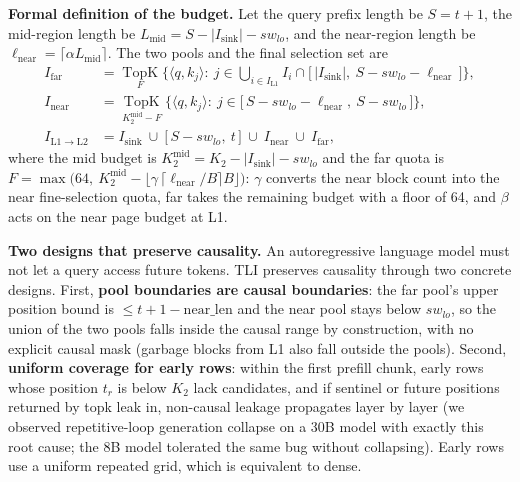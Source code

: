 \documentclass[11pt]{article}
\begin{document}
\textbf{Formal definition of the budget.} Let the query prefix length be $S=t+1$, the mid-region length be $L_{\mathrm{mid}}=S-|I_{\mathrm{sink}}|-sw_{lo}$, and the near-region length be $\ell_{\mathrm{near}}=\lceil\alpha L_{\mathrm{mid}}\rceil$. The two pools and the final selection set are
\begin{align}
I_{\mathrm{far}} &= \operatorname*{TopK}_{F}\Big\{\langle q,k_j\rangle:\ j\in\bigcup\nolimits_{i\in I_{\mathrm{L1}}} I_i\cap\big[\,|I_{\mathrm{sink}}|,\ S-sw_{lo}-\ell_{\mathrm{near}}\,\big]\Big\},\\
I_{\mathrm{near}} &= \operatorname*{TopK}_{K_2^{\mathrm{mid}}-F}\Big\{\langle q,k_j\rangle:\ j\in\big[\,S-sw_{lo}-\ell_{\mathrm{near}},\ S-sw_{lo}\,\big]\Big\},\\
I_{\mathrm{L1}\rightarrow\mathrm{L2}} &= I_{\mathrm{sink}}\ \cup\ \big[\,S-sw_{lo},\ t\,\big]\ \cup\ I_{\mathrm{near}}\ \cup\ I_{\mathrm{far}},
\end{align}
where the mid budget is $K_2^{\mathrm{mid}}=K_2-|I_{\mathrm{sink}}|-sw_{lo}$ and the far quota is $F=\max\big(64,\ K_2^{\mathrm{mid}}-\lfloor\gamma\,\lceil\ell_{\mathrm{near}}/B\rceil B\rfloor\big)$: $\gamma$ converts the near block count into the near fine-selection quota, far takes the remaining budget with a floor of 64, and $\beta$ acts on the near page budget at L1.

\textbf{Two designs that preserve causality.} An autoregressive language model must not let a query access future tokens. TLI preserves causality through two concrete designs. First, \textbf{pool boundaries are causal boundaries}: the far pool's upper position bound is $\leq t+1-\mathrm{near\_len}$ and the near pool stays below $sw_{lo}$, so the union of the two pools falls inside the causal range by construction, with no explicit causal mask (garbage blocks from L1 also fall outside the pools). Second, \textbf{uniform coverage for early rows}: within the first prefill chunk, early rows whose position $t_r$ is below $K_2$ lack candidates, and if sentinel or future positions returned by topk leak in, non-causal leakage propagates layer by layer (we observed repetitive-loop generation collapse on a 30B model with exactly this root cause; the 8B model tolerated the same bug without collapsing). Early rows use a uniform repeated grid, which is equivalent to dense.
\end{document}
